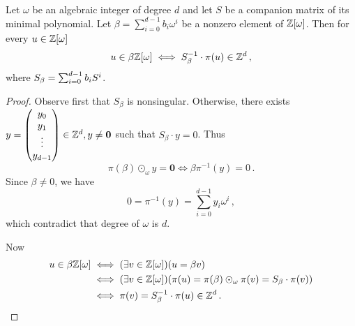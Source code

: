 \begin{theo}
Let $\omega$ be an algebraic integer of degree $d$ and let $S$ be a companion matrix of its minimal polynomial. Let $\beta=\sum_{i=0}^{d-1} b_i \omega^i$ be a nonzero element of $\mathbb{Z}[\omega]$. Then for every $u\in\mathbb{Z}[\omega]$
$$
u\in\beta\mathbb{Z}[\omega] \iff S_\beta^{-1}\cdot \pi(u) \in \mathbb{Z}^d\,,
$$
where $S_\beta=\sum_{i=0}^{d-1} {b}_i S^i$.
\end{theo}
\begin{proof}
Observe first that $S_\beta$ is nonsingular. Otherwise, there exists $y=\begin{pmatrix} {y}_0 \\ {y}_1 \\ \vdots \\ {y}_{d-1} \end{pmatrix} \in \mathbb{Z}^d, y\neq \mathbf{0}$ such that $S_\beta \cdot y=0$. Thus
$$
\pi(\beta)\odot_\omega y=\mathbf{0} \iff \beta \pi^{-1}(y)=0\,.
$$
Since $\beta\neq 0$, we have
$$
0=\pi^{-1}(y)=\sum_{i=0}^{d-1} y_i \omega^i\,,
$$
which contradict that degree of $\omega$ is $d$.

Now
\begin{align*}
u\in\beta\mathbb{Z}[\omega] &\iff (\exists v \in \mathbb{Z}[\omega])(u=\beta v)\\
    &\iff  (\exists v \in \mathbb{Z}[\omega])(\pi(u)=\pi(\beta)\odot_\omega\pi(v)=S_\beta \cdot \pi(v))\\
    &\iff \pi(v)=S_\beta^{-1} \cdot \pi(u) \in \mathbb{Z}^d\,.
\end{align*} 
\end{proof}























  
   